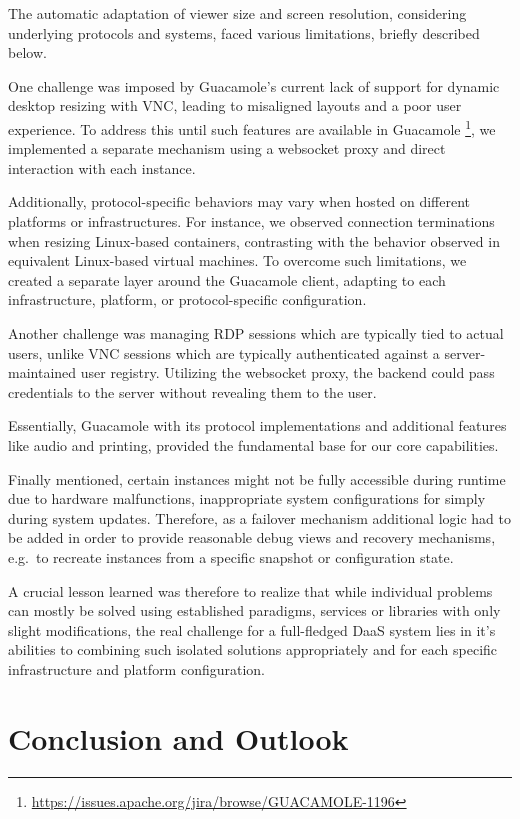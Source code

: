 \documentclass[runningheads]{llncs}
\begin{document}
The automatic adaptation of viewer size and screen resolution,
considering underlying protocols and systems,
faced various limitations, briefly described below.

One challenge was imposed by Guacamole's current lack of support
for dynamic desktop resizing with VNC,
leading to misaligned layouts and a poor user experience.
To address this until such features are available in Guacamole
\footnote{\url{https://issues.apache.org/jira/browse/GUACAMOLE-1196}},
we implemented a separate mechanism using a websocket proxy
and direct interaction with each instance.

Additionally, protocol-specific behaviors may vary
when hosted on different platforms or infrastructures.
For instance, we observed connection terminations when resizing Linux-based containers,
contrasting with the behavior observed in equivalent Linux-based virtual machines.
To overcome such limitations, we created a separate layer around the Guacamole client,
adapting to each infrastructure, platform, or protocol-specific configuration.

Another challenge was managing RDP sessions which are typically tied to actual users,
unlike VNC sessions which are typically authenticated against
a server-maintained user registry.
Utilizing the websocket proxy, the backend could pass credentials
to the server without revealing them to the user.

Essentially, Guacamole with its protocol implementations and additional features like audio and printing,
provided the fundamental base for our core capabilities.

Finally mentioned, certain instances might not be fully accessible during runtime
due to hardware malfunctions, inappropriate system configurations for simply during system updates.
Therefore, as a failover mechanism additional logic had to be added
in order to provide reasonable debug views and recovery mechanisms,
e.g.~to recreate instances from a specific snapshot or configuration state.

A crucial lesson learned was therefore to realize that
while individual problems can mostly be solved
using established paradigms, services or libraries with only slight modifications,
the real challenge for a full-fledged DaaS system lies in it's abilities
to combining such isolated solutions appropriately
and for each specific infrastructure and platform configuration.

\section{Conclusion and Outlook}
\label{sec:Conclusions}
\end{document}
